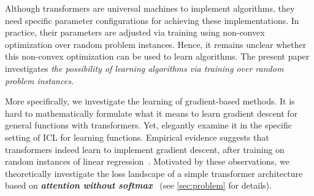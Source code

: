 \documentclass{article}
\newcommand{\emphh}[1]{\textbf{\emph{#1}}}
\begin{document}
Although transformers are universal machines to implement algorithms, they need specific parameter configurations for achieving these implementations. In practice, their parameters are adjusted via training using non-convex optimization over random problem instances. Hence, it remains unclear whether this non-convex optimization can be used to learn algorithms. The present paper investigates \emph{the possibility of learning algorithms via training over random problem instances.}

More specifically, we investigate the learning of gradient-based methods.  It is hard to mathematically formulate what it means to learn gradient descent for general functions with transformers. Yet, \citet{garg2022can} elegantly examine it in the specific setting of ICL for learning functions. Empirical evidence suggests that transformers indeed learn to implement gradient descent, after training on random instances of linear regression~\citep{garg2022can,akyurek2022learning,von2022transformers}. %
Motivated by these observations, we theoretically investigate the loss landscape of a simple transformer architecture based on \emphh{ attention without softmax}~\citep{schlag2021linear,von2022transformers} (see \autoref{sec:problem} for details).
\end{document}
